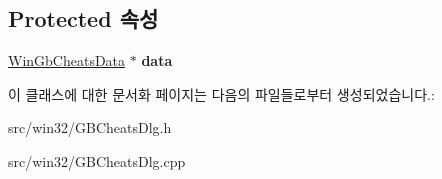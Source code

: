 \subsection*{Protected 속성}
\begin{DoxyCompactItemize}
\item 
\mbox{\label{class_g_b_cheat_search_a3b53d05af5d79a51830df8d06256e1fc}} 
\mbox{\hyperlink{struct_win_gb_cheats_data}{Win\+Gb\+Cheats\+Data}} $\ast$ {\bfseries data}
\end{DoxyCompactItemize}


이 클래스에 대한 문서화 페이지는 다음의 파일들로부터 생성되었습니다.\+:\begin{DoxyCompactItemize}
\item 
src/win32/G\+B\+Cheats\+Dlg.\+h\item 
src/win32/G\+B\+Cheats\+Dlg.\+cpp\end{DoxyCompactItemize}
